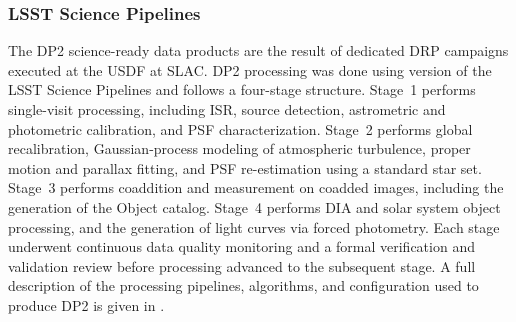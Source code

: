 \subsubsection{LSST Science Pipelines}
\label{ssec:pipelines}
%
The \gls{DP2} science-ready data products are the result of dedicated \gls{DRP} campaigns executed at the \gls{USDF} at \gls{SLAC}.
\gls{DP2} processing was done using version \sciencepipelinesversion of the LSST Science Pipelines \citep[][]{PSTN-019} and follows a four-stage structure.
Stage~1 performs single-visit processing, including \gls{ISR}, source detection, astrometric and photometric \gls{calibration}, and \gls{PSF} characterization.
Stage~2 performs global recalibration, Gaussian-process modeling of atmospheric turbulence, proper motion and parallax fitting, and \gls{PSF} re-estimation using a standard star set.
Stage~3 performs coaddition and measurement on coadded images, including the generation of the \gls{Object} catalog.
Stage~4 performs \gls{DIA} and  solar system object processing, and the generation of light curves via \gls{forced photometry}.
Each stage underwent continuous data quality \gls{monitoring} and a formal verification and validation review before processing advanced to the subsequent stage.
A full description of the processing pipelines, algorithms, and \gls{configuration} used to produce \gls{DP2} is given in .
